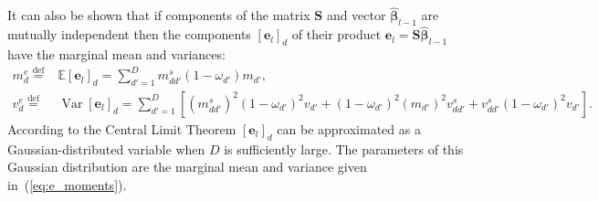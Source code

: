 \documentclass{article}
\begin{document}
 It can also be shown that if components of the matrix $\mathbf{S}$ and vector $\widehat{\boldsymbol\beta}_{l-1}$ are mutually independent then the components $[ \mathbf{e}_l ]_d$ of their product $\mathbf{e}_l = \mathbf{S} \widehat{\boldsymbol\beta}_{l-1}$ have the marginal mean and variances:
  \begin{subequations}
  \label{eq:e_moments}
  \begin{align}
  m^e_{d} \stackrel{\text{def}}{=} &\mathbb{E}[ \mathbf{e}_l ]_d = \sum_{d'=1}^D m^s_{dd'}(1-\omega_{d'})m_{d'}, \\
  v^e_{d} \stackrel{\text{def}}{=} &\operatorname{Var}[ \mathbf{e}_l ]_d = \sum_{d'=1}^D [(m^s_{dd'})^2(1-\omega_{d'})^2v_{d'}
   + (1-\omega_{d'})^2(m_{d'})^2v^s_{dd'} + v^s_{dd'}(1-\omega_{d'})^2v_{d'}].
   \end{align}
  \end{subequations}
According to the Central Limit Theorem $[ \mathbf{e}_l ]_d$ can be approximated as a Gaussian-distributed variable when $D$ is sufficiently large. The parameters of this Gaussian distribution are the marginal mean and variance given in~(\ref{eq:e_moments}).
  
\end{document}
